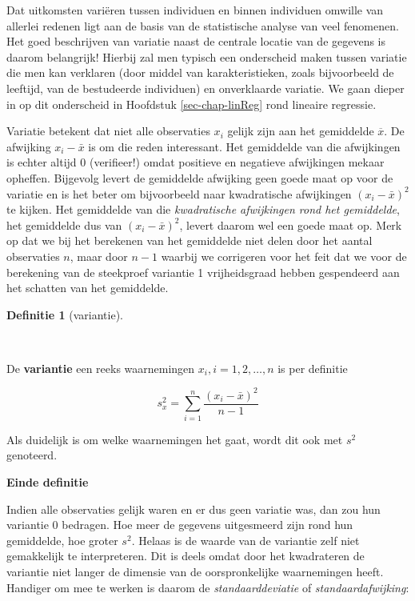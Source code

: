 \documentclass[
  dutch,
  letterpaper,
  12pt]{book}
\theoremstyle{definition}
\theoremstyle{definition}
\newtheorem{definition}{Definitie}[chapter]
\theoremstyle{definition}
\theoremstyle{remark}
\begin{document}
Dat uitkomsten variëren tussen individuen en binnen individuen omwille
van allerlei redenen ligt aan de basis van de statistische analyse van
veel fenomenen. Het goed beschrijven van variatie naast de centrale
locatie van de gegevens is daarom belangrijk! Hierbij zal men typisch
een onderscheid maken tussen variatie die men kan verklaren (door middel
van karakteristieken, zoals bijvoorbeeld de leeftijd, van de bestudeerde
individuen) en onverklaarde variatie. We gaan dieper in op dit
onderscheid in Hoofdstuk \ref{sec-chap-linReg} rond lineaire regressie.

Variatie betekent dat niet alle observaties \(x_i\) gelijk zijn aan het
gemiddelde \(\overline{x}\). De afwijking \(x_i - \bar{x}\) is om die
reden interessant. Het gemiddelde van die afwijkingen is echter altijd 0
(verifieer!) omdat positieve en negatieve afwijkingen mekaar opheffen.
Bijgevolg levert de gemiddelde afwijking geen goede maat op voor de
variatie en is het beter om bijvoorbeeld naar kwadratische afwijkingen
\((x_i - \bar{x})^2\) te kijken. Het gemiddelde van die
\emph{kwadratische afwijkingen rond het gemiddelde}, het gemiddelde dus
van \((x_i - \bar{x})^2\), levert daarom wel een goede maat op. Merk op
dat we bij het berekenen van het gemiddelde niet delen door het aantal
observaties \(n\), maar door \(n-1\) waarbij we corrigeren voor het feit
dat we voor de berekening van de steekproef variantie 1 vrijheidsgraad
hebben gespendeerd aan het schatten van het gemiddelde.

\begin{definition}[variantie]\protect\hypertarget{def-variantie}{}\label{def-variantie}

~

\end{definition}

De \textbf{variantie} een reeks waarnemingen \(x_i, i=1, 2, \dots, n\)
is per definitie

\begin{equation*}
s^2_x = \sum_{i=1}^{n} \frac{(x_i - \bar{x})^2}{n-1}
\end{equation*}

Als duidelijk is om welke waarnemingen het gaat, wordt dit ook met
\(s^2\) genoteerd.

\textbf{Einde definitie}

Indien alle observaties gelijk waren en er dus geen variatie was, dan
zou hun variantie 0 bedragen. Hoe meer de gegevens uitgesmeerd zijn rond
hun gemiddelde, hoe groter \(s^2\). Helaas is de waarde van de variantie
zelf niet gemakkelijk te interpreteren. Dit is deels omdat door het
kwadrateren de variantie niet langer de dimensie van de oorspronkelijke
waarnemingen heeft. Handiger om mee te werken is daarom de
\emph{standaarddeviatie} of \emph{ standaardafwijking}:
\end{document}

